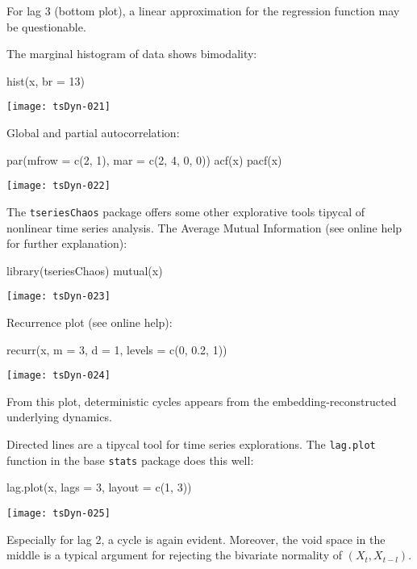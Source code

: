 \documentclass[a4paper]{article}
\begin{document}
For lag 3 (bottom plot), a linear approximation for the regression function may be questionable.

The marginal histogram of data shows bimodality:
\begin{Schunk}
\begin{Sinput}
 hist(x, br = 13)
\end{Sinput}
\end{Schunk}
\texttt{[image: tsDyn-021]}

Global and partial autocorrelation:
\begin{Schunk}
\begin{Sinput}
 par(mfrow = c(2, 1), mar = c(2, 4, 0, 0))
 acf(x)
 pacf(x)
\end{Sinput}
\end{Schunk}
\texttt{[image: tsDyn-022]}

The \texttt{tseriesChaos} package offers some other explorative tools tipycal of nonlinear time series analysis. The Average Mutual Information (see online help for further explanation):
\begin{Schunk}
\begin{Sinput}
 library(tseriesChaos)
 mutual(x)
\end{Sinput}
\end{Schunk}
\texttt{[image: tsDyn-023]}

Recurrence plot (see online help):
\begin{Schunk}
\begin{Sinput}
 recurr(x, m = 3, d = 1, levels = c(0, 0.2, 1))
\end{Sinput}
\end{Schunk}
\texttt{[image: tsDyn-024]}

From this plot, deterministic cycles appears from the embedding-reconstructed underlying dynamics.

Directed lines are a tipycal tool for time series explorations. The \texttt{lag.plot} function in the base \texttt{stats} package does this well:
\begin{Schunk}
\begin{Sinput}
 lag.plot(x, lags = 3, layout = c(1, 3))
\end{Sinput}
\end{Schunk}
\texttt{[image: tsDyn-025]}

Especially for lag 2, a cycle is again evident. Moreover, the void space in the middle is a typical argument for rejecting the bivariate normality of $(X_t, X_{t-l})$.
\end{document}
